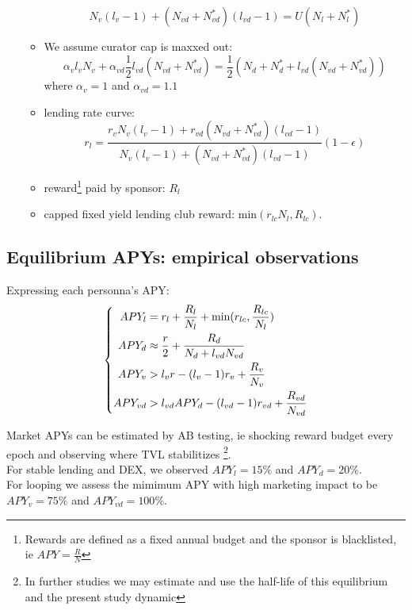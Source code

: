 \documentclass{article}
\begin{document}
\begin{itemize}
\begin{itemize}
            \begin{equation}
                 N_{v}(l_{v}-1) + (N_{vd}+N_{vd}^*)(l_{vd}-1) = U(N_l+N_l^*)
            \end{equation}
            \item We assume curator cap is maxxed out: 
            \begin{equation}    
                \alpha_v l_v N_v + \alpha_{vd} \frac{1}{2} l_{vd} (N_{vd}+N_{vd}^*) =
                  \frac{1}{2}(N_d + N_d^* +  l_{vd} (N_{vd}+N_{vd}^*))
            \end{equation} where $\alpha_v=1$ and $\alpha_{vd}=1.1$
            \item lending rate curve: 
            \begin{equation}
                r_l = \frac{r_v N_v(l_v-1)+r_{vd} (N_{vd}+N_{vd}^*)(l_{vd}-1)}{N_v(l_v-1)+(N_{vd}+N_{vd}^*)(l_{vd}-1)}(1-\epsilon)
            \end{equation}
            \item reward\footnote{Rewards are defined as a fixed annual budget and the sponsor is blacklisted, ie $APY = \frac{R}{N}$} paid by sponsor: $R_l$
            \item capped fixed yield lending club reward: $\text{min}(r_{lc} N_l, R_{lc})$.
        \end{itemize}
        
    \end{itemize}

    
\subsection{Equilibrium APYs: empirical observations}
    Expressing each personna's APY:
    \begin{equation}
    \left\{
    \begin{aligned}
        APY_l &= r_l + \frac{R_l}{N_l} + \text{min}(r_{lc}, \frac{R_{lc}}{N_l})\\
        APY_d &\approx \frac{r}{2}+\frac{R_d}{N_d+l_{vd}N_{vd}}\\
        APY_v &> l_v \space r - (l_v-1)r_v + \frac{R_v}{N_v}\\
        APY_{vd} &> l_{vd} APY_d - (l_{vd}-1)r_{vd} + \frac{R_{vd}}{N_{vd}}
    \end{aligned}
    \right.
    \end{equation}
    
    Market APYs can be estimated by AB testing, ie shocking reward budget every epoch and observing where TVL stabilitizes 
    \footnote{In further studies we may estimate and use the half-life of this equilibrium and the present study dynamic}. \\
    For stable lending and DEX, we observed $APY_l=15\%$ and $APY_d=20\%$. \\
    For looping we assess the mimimum APY with high marketing impact to be $APY_v=75\%$ and $APY_{vd}=100\%$.
\end{document}
